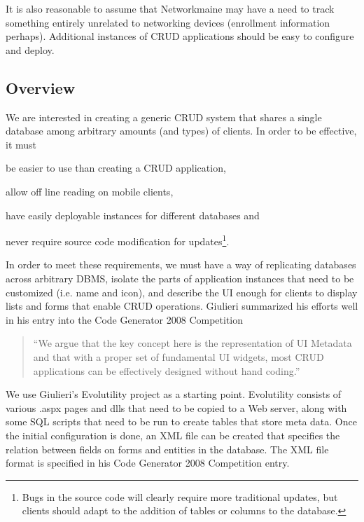 It is also reasonable to assume that Networkmaine may have a need to track
something entirely unrelated to networking devices (enrollment information
perhaps). Additional instances of CRUD applications should be easy to configure
and deploy.


\subsection{Overview}  \label{sec:overview}







We are interested in creating a generic CRUD system that shares a single database among arbitrary amounts (and types) of clients. In order to be effective, it must 
\begin{inparaenum}
\item be easier to use than creating a CRUD application,
\item allow off line reading on mobile clients,
\item have easily deployable instances for different databases and
\item never require source code modification for updates\footnote{Bugs in the source code will clearly require more traditional updates, but clients should adapt to the addition of tables or columns to the database.}.
\end{inparaenum}
In order to meet these requirements, we must have a way of replicating databases across arbitrary DBMS, isolate the parts of application instances that need to be customized (i.e. name and icon), and describe the UI enough for clients to display lists and forms that enable CRUD operations. Giulieri summarized his efforts well in his entry into the Code Generator 2008 Competition\cite{giulieri_minimalist_2011}
\begin{quotation}
``We argue that the key concept here is the representation of UI Metadata and that with a proper set of fundamental UI widgets, most CRUD applications can be effectively designed without hand coding.''
\end{quotation}
We use Giulieri's Evolutility\cite{giulieri_evolutility_????} project as a starting point. Evolutility consists of various .aspx pages and dlls that need to be copied to a Web server, along with some SQL scripts that need to be run to create tables that store meta data. Once the initial configuration is done, an XML file can be created that specifies the relation between fields on forms and entities in the database. The XML file format is specified in his Code Generator 2008 Competition entry\cite{giulieri_minimalist_2011}. 

